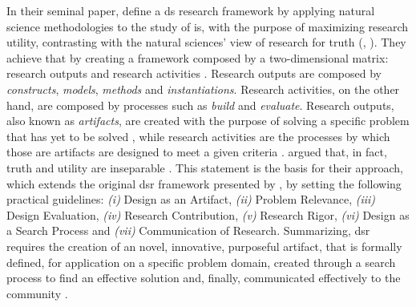 In their seminal paper, \citeauthor{march_design_1995} \cite{march_design_1995} define a \gls{ds} research framework by applying natural science methodologies to the study of \gls{is}, with the purpose of maximizing research utility, contrasting with the natural sciences' view of research for truth (\cite[80]{hevner_design_2004}, \cite[253]{march_design_1995}). They achieve that by creating a framework composed by a two-dimensional matrix: research outputs and research activities \cite[255]{march_design_1995}. Research outputs are composed by \textit{constructs}, \textit{models}, \textit{methods} and \textit{instantiations}. Research activities, on the other hand, are composed by processes such as \textit{build} and \textit{evaluate}. Research outputs, also known as \textit{artifacts}, are created with the purpose of solving a specific problem that has yet to be solved \cite[78]{hevner_design_2004}, while research activities are the processes by which those are artifacts are designed to meet a given criteria \cite[79--80]{hevner_design_2004}. \citeauthor{hevner_design_2004} argued that, in fact, truth and utility are inseparable \cite[80]{hevner_design_2004}. This statement is the basis for their approach, which extends the original \gls{dsr} framework presented by \citeauthor{march_design_1995}, by setting the following practical guidelines: \emph{(i)} Design as an Artifact, \emph{(ii)} Problem Relevance, \emph{(iii)} Design Evaluation, \emph{(iv)} Research Contribution, \emph{(v)} Research Rigor, \emph{(vi)} Design as a Search Process and \emph{(vii)} Communication of Research. Summarizing, \gls{dsr} requires the creation of an novel, innovative, purposeful artifact, that is formally defined, for application on a specific problem domain, created through a search process to find an effective solution and, finally, communicated effectively to the community \cite[82]{hevner_design_2004}.

